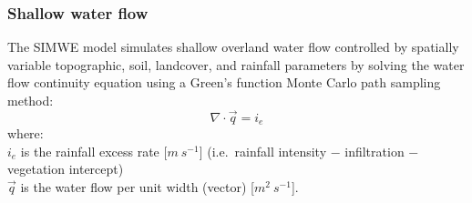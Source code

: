 \documentclass[gmd, manuscript]{copernicus}
\begin{document}

\subsubsection{Shallow water flow}

The SIMWE model simulates shallow overland water flow
controlled by spatially variable topographic, soil, landcover, 
and rainfall parameters by solving the water flow continuity equation 
using a Green's function Monte Carlo path sampling method:
\begin{equation}
\label{eq:water}
\nabla \cdot \vec{q} = i_e
\end{equation}
{\small
\noindent
where: \\
\noindent
\hspace*{0.5em} $i_e$ is the rainfall excess rate [$\unit{m~s^{-1}}$]
(i.e.~rainfall intensity $-$ infiltration $-$ vegetation intercept)\\
\hspace*{0.5em} $\vec{q}$ is the water flow per unit width (vector) [$\unit{m}^2~\unit{s}^{-1}$]. 
}
\end{document}
